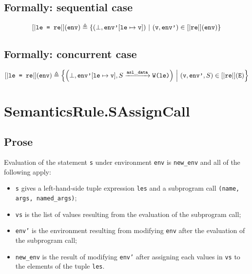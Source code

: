 \documentclass{book}
\begin{document}
\begin{formal}
  \subsection{Formally: sequential case}
  \begin{align}
    \left[| \texttt{le = re} \right|] (\texttt{env}) \triangleq
      \left\{ \left(\bot, \texttt{env'}[\texttt{le} \mapsto \texttt{v} ]\right) \ \middle|\ {} (\texttt{v}, \texttt{env'}) \in \left[| \texttt{re} \right|] (\texttt{env}) \right\}
    \label{eq:sem-seq-sassign}
  \end{align}

  \subsection{Formally: concurrent case}
  \begin{align}
    \left[| \texttt{le = re} \right|] (\texttt{env}) \triangleq
      \left\{ \left(\bot, \texttt{env'}[\texttt{le} \mapsto \texttt{v} ], S \xrightarrow{\mathtt{asl\_data}} \texttt{W(le)}\right) \ \middle|\ {}
        (\texttt{v}, \texttt{env'}, S) \in \left[| \texttt{re} \right|] (\texttt{E})
      \right\}
    \label{eq:sem-conc-sassign}
  \end{align}
\end{formal}


\section{SemanticsRule.SAssignCall \label{sec:SemanticsRule.SAssignCall}}

    \subsection{Prose}
  Evaluation of the statement \texttt{s} under environment \texttt{env} is
\texttt{new\_env} and all of the following apply:
  \begin{itemize}
  \item \texttt{s} gives a left-hand-side tuple expression \texttt{les} and a subprogram call \texttt{(name, args, named\_args)};
  \item \texttt{vs} is the list of values resulting from the evaluation of the subprogram call;
  \item \texttt{env'} is the environment resulting from modifying \texttt{env} after the evaluation of the subprogram call;
  \item \texttt{new\_env} is the result of modifying \texttt{env'} after assigning each values in \texttt{vs} to the elements of the tuple \texttt{les}.
  \end{itemize}
\end{document}
